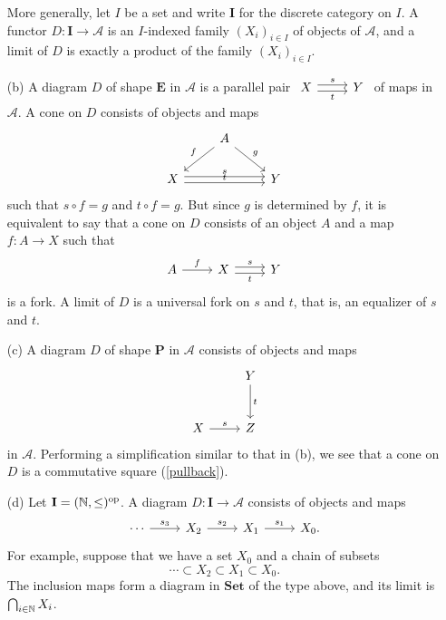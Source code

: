 \begin{example}
\begin{enumerate}
      More generally, let  $I$ be a set and write  $\mathbf{I}$ for the discrete category on $I$. A functor $D:\mathbf{I}\to \mathscr{A}$ is an $I$-indexed family $(X_i)_{i \in I}$ of objects of $\mathscr{A}$, and a limit of $D$ is exactly a product of the family $(X_i)_{i\in I}$. 
    \item [(b)] A diagram $D$ of shape $\mathbf{E}$ in $\mathscr{A}$ is a parallel pair $
      \begin{tikzcd}
	X\arrow[r, shift left,"s"]\arrow[r,shift right, "t"']& Y  
      \end{tikzcd}$ of maps in $\mathscr{A}$. A cone on  $D$ consists of objects and maps
      \[
      \begin{tikzcd}
	&A\arrow[ld,"f"']\arrow[rd,"g"]  &\\
	X\arrow[rr,shift left, "s"]\arrow[rr,shift right,"t"]  &&Y
      \end{tikzcd}
      \] 
      such that $s\circ f=g$ and $t\circ f=g$. But since $g$ is determined by $f$, it is equivalent to say that a cone on $D$ consists of an object $A$ and a map $f:A\to X$ such that 
      \[
      \begin{tikzcd}
	A\arrow[r,"f"] &X\arrow[r,shift left,"s"] \arrow[r,shift right, "t"'] &Y
      \end{tikzcd}
      \] 
      is a fork. A limit of $D$ is a universal fork on $s$ and $t$, that is, an equalizer of $s$ and $t$.
    \item [(c)] A diagram $D$ of shape $\mathbf{P}$ in $\mathscr{A}$ consists of objects and maps \[
	\begin{tikzcd}[row sep =large]
      & Y\arrow[d,"t"]\\
      X\arrow[r,"s"]& Z 
    \end{tikzcd}
  \] in $\mathscr{A}$. Performing a simplification similar to that in (b), we see that a cone on  $D$ is a commutative square (\ref{pullback}).
\item [(d)] Let $\mathbf{I}=(\mathbb{N},\le)^{\mathrm{op}}$. A diagram $D:\mathbf{I}\to \mathscr{A}$ consists of objects and maps
  \[
  \begin{tikzcd}
    \cdots \arrow[r,"s_3"] &X_2\arrow[r,"s_2"] &X_1\arrow[r,"s_1"] &X_0.  
  \end{tikzcd}
  \] 
  For example, suppose that we have a set $X_0$ and a chain of subsets
  \[
  \cdots \subset X_2\subset X_1\subset X_0. 
  \] 
  The inclusion maps form a diagram in $\mathbf{Set}$ of the type above, and its limit is $\bigcap_{i\in \mathbb{N}} X_i$.
  \end{enumerate}
\end{example}

